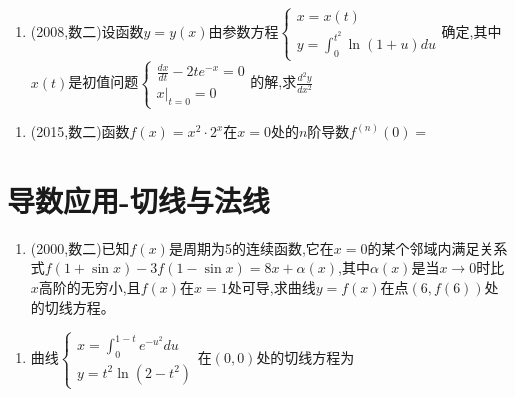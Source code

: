 \documentclass[12pt, a4paper, oneside, UTF8]{ctexbook}
\begin{document}
\begin{enumerate}[label=\arabic*.,start=8]
    \item (2008,数二)设函数$y=y(x)$由参数方程$\begin{cases}
        x=x(t) \\
        y=\int_0^{t^2}\ln(1+u)du
    \end{cases}$确定,其中$x(t)$是初值问题$\begin{cases}
        \frac{dx}{dt}-2te^{-x}=0 \\
        x|_{t=0}=0
    \end{cases}$的解,求$\frac{d^2y}{dx^2}$
    
    \begin{solution}
    
    \end{solution}
\end{enumerate}

\begin{enumerate}[label=\arabic*.,start=9]
    \item (2015,数二)函数$f(x)=x^2\cdot2^x$在$x=0$处的$n$阶导数$f^{(n)}(0)=$\underline{\quad}
    
    \begin{solution}
    
    \end{solution}
\end{enumerate}

\section{导数应用-切线与法线}


\begin{enumerate}[label=\arabic*.,start=10]
    \item  (2000,数二)已知$f(x)$是周期为5的连续函数,它在$x=0$的某个邻域内满足关系式$f(1+\sin x)-3f(1-\sin x)=8x+\alpha(x)$,其中$\alpha(x)$是当$x\to0$时比$x$高阶的无穷小,且$f(x)$在$x=1$处可导,求曲线$y=f(x)$在点$(6,f(6))$处的切线方程。
    
    \begin{solution}
    
    \end{solution}
\end{enumerate}


\begin{enumerate}[label=\arabic*.,start=11]
    \item  曲线$\begin{cases}
        x=\int_0^{1-t}e^{-u^2}du \\
        y=t^2\ln(2-t^2)
    \end{cases}$在$(0,0)$处的切线方程为\underline{\quad}
    
    \begin{solution}
    \end{solution}
\end{enumerate}
\end{document}
